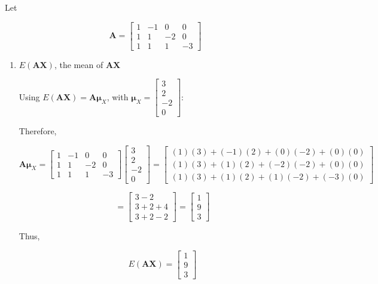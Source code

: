 \documentclass[12pt]{article}
\begin{document}
\noindent Let

$$
\mathbf{A} =
\begin{bmatrix}
1 & -1 & 0 & 0 \\
1 & 1 & -2 & 0 \\
1 & 1 & 1 & -3
\end{bmatrix}
$$

\begin{enumerate}
\item[(a)] $E(\mathbf{A}\mathbf{X})$, the mean of $\mathbf{A}\mathbf{X}$

\vspace{0.5em}

\noindent Using $E(\mathbf{A}\mathbf{X}) = \mathbf{A}\boldsymbol{\mu}_X$, with $\boldsymbol{\mu}_X = \begin{bmatrix} 3 \\ 2 \\ -2 \\ 0 \end{bmatrix}$:

Therefore,

$$
\mathbf{A}\boldsymbol{\mu}_X = \begin{bmatrix}
1 & -1 & 0 & 0 \\
1 & 1 & -2 & 0 \\
1 & 1 & 1 & -3
\end{bmatrix} 
\begin{bmatrix} 3 \\ 2 \\ -2 \\ 0 \end{bmatrix} 
= 
\begin{bmatrix}
(1)(3)+(-1)(2)+(0)(-2)+(0)(0) \\
(1)(3)+(1)(2)+(-2)(-2)+(0)(0) \\
(1)(3)+(1)(2)+(1)(-2)+(-3)(0)
\end{bmatrix}
$$

$$
=
\begin{bmatrix}
3-2 \\
3+2+4 \\
3+2-2
\end{bmatrix} 
= \begin{bmatrix} 1 \\ 9 \\ 3 \end{bmatrix}
$$

\noindent Thus, 

$$
\boxed{
E(\mathbf{A}\mathbf{X}) = \begin{bmatrix} 1 \\ 9 \\ 3 \end{bmatrix}
}
$$


\end{enumerate}
\end{document}
